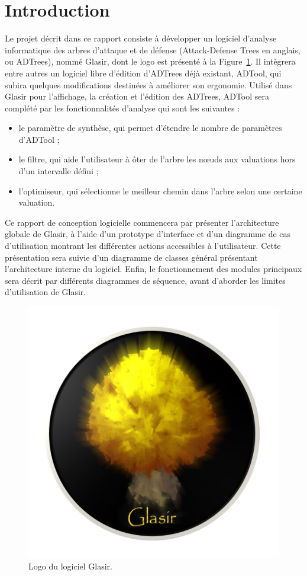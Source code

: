 \section{Introduction}
    \label{sec:intro}

    Le projet décrit dans ce rapport consiste à développer un logiciel d'analyse informatique des arbres d'attaque et de défense (\og Attack-Defense Trees \fg{} en anglais, ou ADTrees), nommé Glasir, dont le logo est présenté à la {\sc Figure}~\ref{fig:glasir}. Il intègrera entre autres un logiciel libre d'édition d'ADTrees déjà existant, ADTool, qui subira quelques modifications destinées à améliorer son ergonomie. Utilisé dans Glasir pour l'affichage, la création et l'édition des ADTrees, ADTool sera complété par les fonctionnalités d'analyse qui sont les suivantes :

    \begin{itemize}
    	\item le paramètre de synthèse, qui permet d'étendre le nombre de paramètres d'ADTool ;
    	\item le filtre, qui aide l'utilisateur à ôter de l’arbre les nœuds aux valuations hors d'un intervalle défini ;
    	\item l'optimiseur, qui sélectionne le meilleur chemin dans l'arbre selon une certaine valuation.
    \end{itemize} 

    Ce rapport de conception logicielle commencera par présenter l'architecture globale de Glasir, à l'aide d'un prototype d'interface et d'un diagramme de cas d'utilisation montrant les différentes actions accessibles à l'utilisateur. Cette présentation sera suivie d'un diagramme de classes général présentant l'architecture interne du logiciel. Enfin, le fonctionnement des modules principaux sera décrit par différents diagrammes de séquence, avant d'aborder les limites d'utilisation de Glasir.

    \begin{figure}[H]
        \centering
        \includegraphics[height=0.5\textwidth]{figure/glasir.png}
        \caption{Logo du logiciel Glasir.}
        \label{fig:glasir}
    \end{figure}